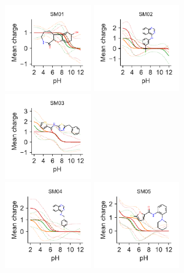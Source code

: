 \documentclass[9pt,lineno,final]{elife}
\begin{document}
    
\begin{figure}[H]
	\centering	
	\includegraphics[width=0.33\textwidth]{Reports/SM01-titrationcurve-views.pdf}
	\includegraphics[width=0.33\textwidth]{Reports/SM02-titrationcurve-views.pdf}
	\includegraphics[width=0.33\textwidth]{Reports/SM03-titrationcurve-views.pdf}	 \\
    \includegraphics[width=0.33\textwidth]{Reports/SM04-titrationcurve-views.pdf}
	\includegraphics[width=0.33\textwidth]{Reports/SM05-titrationcurve-views.pdf}

\end{figure}
\end{document}
